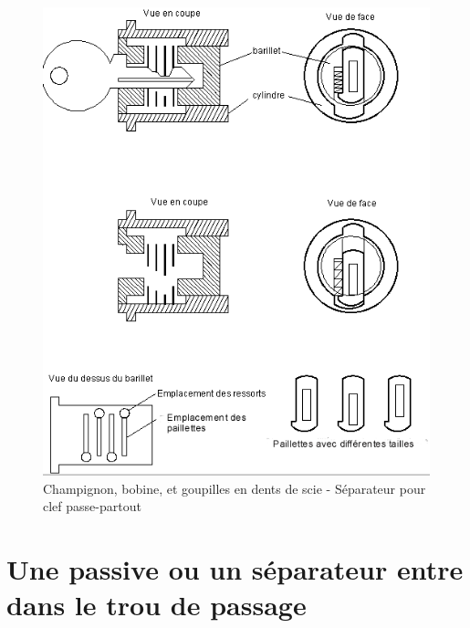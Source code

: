 \documentclass[a4paper,french,11pt,twoside]{report}
\begin{document}

\begin{figure}[h] \begin{center}
        \includegraphics[scale=0.6]{images/Image26}
        \caption{Champignon, bobine, et goupilles en dents de scie - Séparateur pour clef passe-partout}
\end{center} \end{figure}


\section{\label{passive_separateur_trou_passage}Une passive ou un séparateur entre dans le trou de passage}
\end{document}
